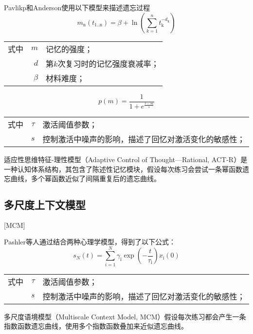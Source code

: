 Pavlikp和Anderson\cite{pavlikUsingModelCompute2008}使用以下模型来描述遗忘过程
\begin{equation}
m_\mathrm{n}(t_\mathrm{1..n}) = \beta + \ln(\sum\limits_{k=1}^n t_\mathrm{k}^{-d_\mathrm{k}})
\end{equation}
\begin{tabularx}{\textwidth}{@{}l@{\quad}r@{———}X@{}}
    式中& $m$ &记忆的强度；\\
    & $d$ &第$k$次复习时的记忆强度衰减率；\\
    & $\beta$ &材料难度；
\end{tabularx}\vspace{3.15bp}
\begin{equation}
p(m) = \frac{1}{1+e^{\frac{\tau-m}{s}}}
\end{equation}
\begin{tabularx}{\textwidth}{@{}l@{\quad}r@{———}X@{}}
    式中& $\tau$ &激活阈值参数；\\
    & $s$ &控制激活中噪声的影响，描述了回忆对激活变化的敏感性；
\end{tabularx}\vspace{3.15bp}

适应性思维特征-理性模型（Adaptive Control of Thought—Rational, ACT-R）\cite{andersonIntegratedTheoryMind2004}是一种认知体系结构，其包含了陈述性记忆模块，假设每次练习会尝试一条幂函数遗忘曲线，多个幂函数近似了间隔重复后的遗忘曲线。

\subsection{多尺度上下文模型}[MCM]

Pashler等人\cite{pashlerPredictingOptimalSpacing2009}通过结合两种心理学模型，得到了以下公式：
\begin{equation}
    s_{N}(t)=\sum_{i=1}^{N} \gamma_\mathrm{i} \exp \left(-\frac{t}{\tau_\mathrm{i}}\right) x_\mathrm{i}(0)
\end{equation}
\begin{tabularx}{\textwidth}{@{}l@{\quad}r@{———}X@{}}
    式中& $\tau$ &激活阈值参数；\\
    & $s$ &控制激活中噪声的影响，描述了回忆对激活变化的敏感性；
\end{tabularx}\vspace{3.15bp}

多尺度语境模型（Multiscale Context Model, MCM）\cite{pashlerPredictingOptimalSpacing2009}假设每次练习都会产生一条指数函数遗忘曲线，使用多个指数函数叠加来近似遗忘曲线。

